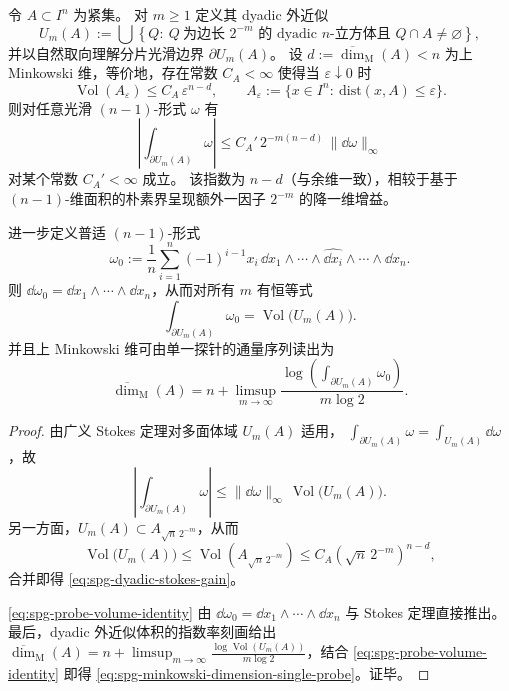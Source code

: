\begin{theorem}\label{thm:spg-dyadic-outer-approx-stokes-gain-minkowski-readout}
令 \(A\subset I^n\) 为紧集。
对 \(m\ge 1\) 定义其 dyadic 外近似
\[
U_m(A):=\bigcup\left\{Q:\ Q\ \text{为边长 }2^{-m}\text{ 的 dyadic }n\text{-立方体且 }Q\cap A\neq\varnothing\right\},
\]
并以自然取向理解分片光滑边界 \(\partial U_m(A)\)。
设 \(d:=\overline{\dim}_{\mathrm M}(A)<n\) 为上 Minkowski 维，等价地，存在常数 \(C_A<\infty\) 使得当 \(\varepsilon\downarrow 0\) 时
\[
\operatorname{Vol}(A_\varepsilon)\le C_A\,\varepsilon^{n-d},
\qquad
A_\varepsilon:=\{x\in I^n:\ \mathrm{dist}(x,A)\le \varepsilon\}.
\]
则对任意光滑 \((n-1)\)-形式 \(\omega\) 有
\begin{equation}\label{eq:spg-dyadic-stokes-gain}
\left|\int_{\partial U_m(A)}\omega\right|
\le C_A'\,2^{-m(n-d)}\,\|\dd\omega\|_\infty
\end{equation}
对某个常数 \(C_A'<\infty\) 成立。
该指数为 \(n-d\)（与余维一致），相较于基于 \((n-1)\)-维面积的朴素界呈现额外一因子 \(2^{-m}\) 的降一维增益。
\par
进一步定义普适 \((n-1)\)-形式
\begin{equation}\label{eq:spg-universal-stokes-probe-form}
\omega_0:=\frac1n\sum_{i=1}^n (-1)^{i-1} x_i\,\dd x_1\wedge\cdots\wedge\widehat{\dd x_i}\wedge\cdots\wedge \dd x_n.
\end{equation}
则 \(\dd\omega_0=\dd x_1\wedge\cdots\wedge \dd x_n\)，从而对所有 \(m\) 有恒等式
\begin{equation}\label{eq:spg-probe-volume-identity}
\int_{\partial U_m(A)}\omega_0=\operatorname{Vol}\bigl(U_m(A)\bigr).
\end{equation}
并且上 Minkowski 维可由单一探针的通量序列读出为
\begin{equation}\label{eq:spg-minkowski-dimension-single-probe}
\overline{\dim}_{\mathrm M}(A)
=
n+\limsup_{m\to\infty}\frac{\log\!\left(\int_{\partial U_m(A)}\omega_0\right)}{m\log 2}.
\end{equation}
\end{theorem}
\begin{proof}
由广义 Stokes 定理对多面体域 \(U_m(A)\) 适用，
\(
\int_{\partial U_m(A)}\omega=\int_{U_m(A)}\dd\omega
\)，故
\[
\left|\int_{\partial U_m(A)}\omega\right|
\le \|\dd\omega\|_\infty\,\operatorname{Vol}\bigl(U_m(A)\bigr).
\]
另一方面，\(U_m(A)\subset A_{\sqrt n\,2^{-m}}\)，从而
\[
\operatorname{Vol}\bigl(U_m(A)\bigr)\le \operatorname{Vol}(A_{\sqrt n\,2^{-m}})
\le C_A(\sqrt n\,2^{-m})^{n-d},
\]
合并即得 \eqref{eq:spg-dyadic-stokes-gain}。
\par
\eqref{eq:spg-probe-volume-identity} 由 \(\dd\omega_0=\dd x_1\wedge\cdots\wedge \dd x_n\) 与 Stokes 定理直接推出。
最后，dyadic 外近似体积的指数率刻画给出
\(
\overline{\dim}_{\mathrm M}(A)
=n+\limsup_{m\to\infty}\frac{\log\operatorname{Vol}(U_m(A))}{m\log 2}
\)，结合 \eqref{eq:spg-probe-volume-identity} 即得 \eqref{eq:spg-minkowski-dimension-single-probe}。证毕。
\end{proof}

